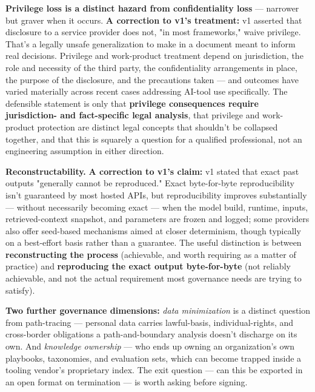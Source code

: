 \textbf{Privilege loss is a distinct hazard from confidentiality loss} --- narrower but graver when it occurs. \textbf{A correction to v1's treatment:} v1 asserted that disclosure to a service provider does not, "in most frameworks," waive privilege. That's a legally unsafe generalization to make in a document meant to inform real decisions. Privilege and work-product treatment depend on jurisdiction, the role and necessity of the third party, the confidentiality arrangements in place, the purpose of the disclosure, and the precautions taken --- and outcomes have varied materially across recent cases addressing AI-tool use specifically. The defensible statement is only that \textbf{privilege consequences require jurisdiction- and fact-specific legal analysis}, that privilege and work-product protection are distinct legal concepts that shouldn't be collapsed together, and that this is squarely a question for a qualified professional, not an engineering assumption in either direction.

\textbf{Reconstructability.} \textbf{A correction to v1's claim:} v1 stated that exact past outputs "generally cannot be reproduced." Exact byte-for-byte reproducibility isn't guaranteed by most hosted APIs, but reproducibility improves substantially --- without necessarily becoming exact --- when the model build, runtime, inputs, retrieved-context snapshot, and parameters are frozen and logged; some providers also offer seed-based mechanisms aimed at closer determinism, though typically on a best-effort basis rather than a guarantee. The useful distinction is between \textbf{reconstructing the process} (achievable, and worth requiring as a matter of practice) and \textbf{reproducing the exact output byte-for-byte} (not reliably achievable, and not the actual requirement most governance needs are trying to satisfy).

\textbf{Two further governance dimensions:} \emph{data minimization} is a distinct question from path-tracing --- personal data carries lawful-basis, individual-rights, and cross-border obligations a path-and-boundary analysis doesn't discharge on its own. And \emph{knowledge ownership} --- who ends up owning an organization's own playbooks, taxonomies, and evaluation sets, which can become trapped inside a tooling vendor's proprietary index. The exit question --- can this be exported in an open format on termination --- is worth asking before signing.

